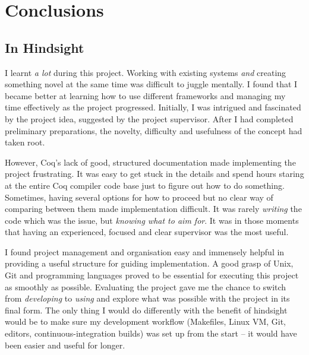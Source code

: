 \chapter{Conclusions}

%

\section{In Hindsight}

I learnt \emph{a lot} during this project.  Working with existing systems
\emph{and} creating something novel at the same time was difficult to juggle
mentally. I found that I became better at learning how to use different
frameworks and managing my time effectively as the project progressed.
Initially, I was intrigued and fascinated by the project idea, suggested by the
project supervisor. After I had completed preliminary preparations, the novelty,
difficulty and usefulness of the concept had taken root.

However, Coq's lack of good, structured documentation made implementing the
project frustrating.  It was easy to get stuck in the details and spend hours
staring at the entire Coq compiler code base just to figure out how to do
something.  Sometimes, having several options for how to proceed but no clear
way of comparing between them made implementation difficult. It was rarely
\emph{writing} the code which was the issue, but \emph{knowing what to aim for}.
It was in those moments that having an experienced, focused and clear supervisor
was the most useful.

I found project management and organisation easy and immensely helpful in
providing a useful structure for guiding implementation. A good grasp of Unix,
Git and programming languages proved to be essential for executing this project
as smoothly as possible. Evaluating the project gave me the chance to switch
from \emph{developing} to \emph{using} and explore what was possible with the
project in its final form. The only thing I would do differently with the
benefit of hindsight would be to make sure my development workflow (Makefiles,
Linux VM, Git, editors, continuous-integration builds) was set up from the start
-- it would have been easier and useful for longer.

